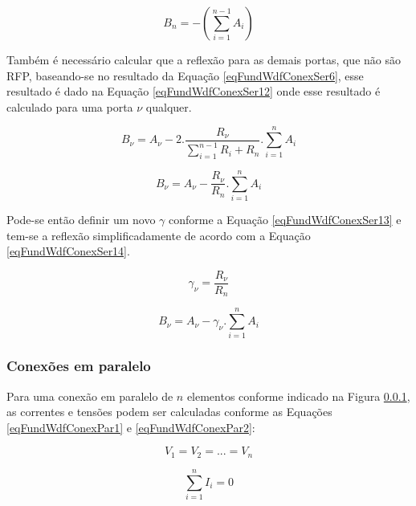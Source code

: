 	\begin{equation}
		\label{eqFundWadfConexSer11}
		B_n = -(\sum_{i=1}^{n-1} A_i)
	\end{equation}
	
	Também é necessário calcular que a reflexão para as demais portas, que não são RFP, baseando-se no resultado da Equação \ref{eqFundWdfConexSer6}, esse resultado é dado na Equação \ref{eqFundWdfConexSer12} onde esse resultado é calculado para uma porta $\nu$ qualquer.
		
	\begin{equation}
		B_{\nu} = A_{\nu} - 2.\frac{R_{\nu}}{\sum_{i=1}^{n-1} R_i+R_n}.\sum_{i=1}^{n} A_i
	\end{equation}
	
	\begin{equation}
		\label{eqFundWdfConexSer12}
		B_{\nu} = A_{\nu} - \frac{R_{\nu}}{R_n}.\sum_{i=1}^{n} A_i
	\end{equation}
	
	Pode-se então definir um novo $\gamma$ conforme a Equação \ref{eqFundWdfConexSer13} e tem-se a  reflexão simplificadamente de acordo com a Equação \ref{eqFundWdfConexSer14}.
	
	\begin{equation}
		\label{eqFundWdfConexSer13}
		\gamma_{\nu} = \frac{R_{\nu}}{R_n}
	\end{equation} 
	
	\begin{equation}
		\label{eqFundWdfConexSer14}
		B_{\nu} = A_{\nu} - \gamma_{\nu}.\sum_{i=1}^{n} A_i
	\end{equation}

	
		\subsubsection{Conexões em paralelo}
	
	Para uma conexão em paralelo de $n$ elementos conforme indicado na Figura \ref{}, as correntes e tensões podem ser calculadas conforme as Equações \ref{eqFundWdfConexPar1} e \ref{eqFundWdfConexPar2}:
	
	\begin{equation}
		\label{eqFundWdfConexPar1}
		V_1 = V_2 = ... = V_n
	\end{equation}
	
	\begin{equation}
		\label{eqFundWdfConexPar2}
		\sum_{i=1}^{n} I_i = 0
	\end{equation}
	
